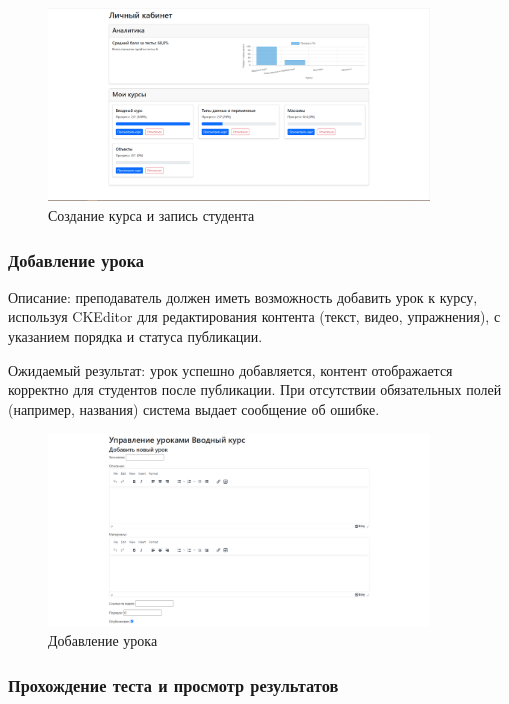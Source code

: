 \begin{figure}[ht]
		\centering
		\includegraphics[width=0.9\textwidth]{images/запись} 
		\caption{Создание курса и запись студента}
		\label{enroll:image}
\end{figure}
	
\subsubsection{Добавление урока}
	
Описание: преподаватель должен иметь возможность добавить урок к курсу, используя CKEditor для редактирования контента (текст, видео, упражнения), с указанием порядка и статуса публикации.
	
Ожидаемый результат: урок успешно добавляется, контент отображается корректно для студентов после публикации. При отсутствии обязательных полей (например, названия) система выдает сообщение об ошибке.
	
	\begin{figure}[ht]
		\centering
		\includegraphics[width=0.9\textwidth]{images/урокдобавить} 
		\caption{Добавление урока}
		\label{urok:image}
	\end{figure}
\newpage
\subsubsection{Прохождение теста и просмотр результатов}
	
